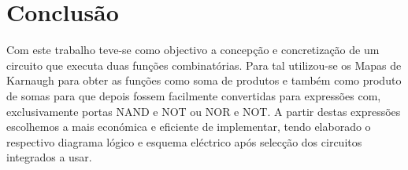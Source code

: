 \documentclass[a4paper,12pt]{article}
\begin{document}
\section{Conclusão}
Com este trabalho teve-se como objectivo a concepção e concretização de um circuito que executa duas funções combinatórias. Para tal utilizou-se os Mapas de Karnaugh para obter as funções como soma de produtos e também como produto de somas para que depois fossem facilmente convertidas para expressões com, exclusivamente portas NAND e NOT ou NOR e NOT. A partir destas expressões escolhemos a mais económica e eficiente de implementar, tendo elaborado o respectivo diagrama lógico e esquema eléctrico após selecção dos circuitos integrados a usar.
\end{document}

